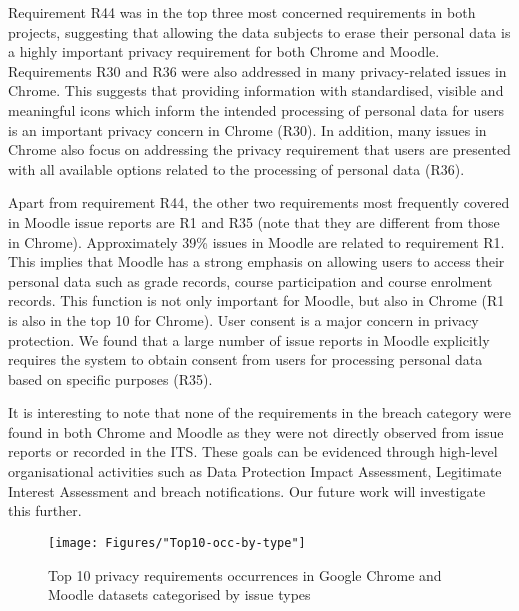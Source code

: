 Requirement R44 was in the top three most concerned requirements in both projects, suggesting that allowing the data subjects to erase their personal data is a highly important privacy requirement for both Chrome and Moodle. Requirements R30 and R36 were also addressed in many privacy-related issues in Chrome. This suggests that providing information with standardised, visible and meaningful icons which inform the intended processing of personal data for users is an important privacy concern in Chrome (R30). In addition, many issues in Chrome also focus on addressing the privacy requirement that users are presented with all available options related to the processing of personal data (R36).

Apart from requirement R44, the other two requirements most frequently covered in Moodle issue reports are R1 and R35 (note that they are different from those in Chrome). Approximately 39\% issues in Moodle are related to requirement R1. This implies that Moodle has a strong emphasis on allowing users to access their personal data such as grade records, course participation and course enrolment records. This function is not only important for Moodle, but also in Chrome (R1 is also in the top 10 for Chrome). User consent is a major concern in privacy protection. We found that a large number of issue reports in Moodle explicitly requires the system to obtain consent from users for processing personal data based on specific purposes (R35).


It is interesting to note that none of the requirements in the breach category were found in both Chrome and Moodle as they were not directly observed from issue reports or recorded in the ITS. These goals can be evidenced through high-level organisational activities such as Data Protection Impact Assessment, Legitimate Interest Assessment and breach notifications. Our future work will investigate this further.

\begin{figure}[ht]
	\centering
	\texttt{[image: Figures/"Top10-occ-by-type"]}
	\caption{Top 10 privacy requirements occurrences in Google Chrome and Moodle datasets categorised by issue types}
	\label{fig:top10}
\end{figure}

